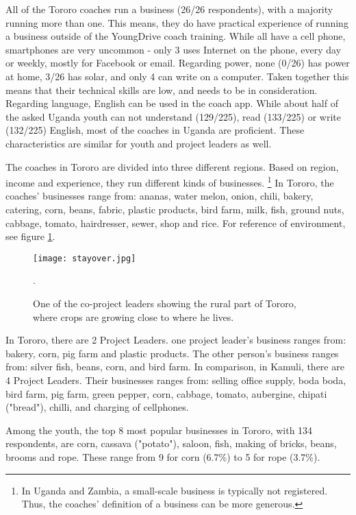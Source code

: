 All of the Tororo coaches run a business (26/26 respondents), with a majority running more than one. This means, they do have practical experience of running a business outside of the YoungDrive coach training. While all have a cell phone, smartphones are very uncommon - only 3 uses Internet on the phone, every day or weekly, mostly for Facebook or email. Regarding power, none (0/26) has power at home, 3/26 has solar, and only 4 can write on a computer. Taken together this means that their technical skills are low, and needs to be in consideration. Regarding language, English can be used in the coach app. While about half of the asked Uganda youth can not understand (129/225), read (133/225) or write (132/225) English, most of the coaches in Uganda are proficient. These characteristics are similar for youth and project leaders as well.

The coaches in Tororo are divided into three different regions. Based on region, income and experience, they run different kinds of businesses. \footnote{In Uganda and Zambia, a small-scale business is typically not registered. Thus, the coaches' definition of a business can be more generous.} In Tororo, the coaches' businesses range from: ananas, water melon, onion, chili, bakery, catering, corn, beans, fabric, plastic products, bird farm, milk, fish, ground nuts, cabbage, tomato, hairdresser, sewer, shop and rice. For reference of environment, see figure \ref{fig:tororo}.

\begin{figure}[h]
    \centering
    \texttt{[image: stayover.jpg]}
    \caption{One of the co-project leaders showing the rural part of Tororo, where crops are growing close to where he lives.}.
    \label{fig:tororo}
\end{figure}

In Tororo, there are 2 Project Leaders. one project leader's business ranges from: bakery, corn, pig farm and plastic products. The other person's business ranges from: silver fish, beans, corn, and bird farm. In comparison, in Kamuli, there are 4 Project Leaders. Their businesses ranges from: selling office supply, boda boda, bird farm, pig farm, green pepper, corn, cabbage, tomato, aubergine, chipati ("bread"), chilli, and charging of cellphones.

Among the youth, the top 8 most popular businesses in Tororo, with 134 respondents, are corn, cassava ("potato"), saloon, fish, making of bricks, beans, brooms and rope. These range from 9 for corn (6.7\%) to 5 for rope (3.7\%).

